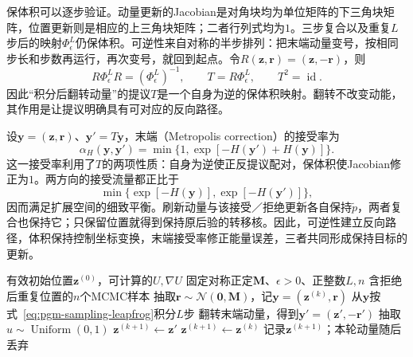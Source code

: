 保体积可以逐步验证。动量更新的Jacobian是对角块均为单位矩阵的下三角块矩阵，位置更新则是相应的上三角块矩阵；二者行列式均为$1$。三步复合以及重复$L$步后的映射$\Phi_{\epsilon}^{L}$仍保体积。可逆性来自对称的半步排列：把末端动量变号，按相同步长和步数再运行，再次变号，就回到起点。令$R(\bm{z},\bm{r})=(\bm{z},-\bm{r})$，则
\begin{equation}
  R\Phi_{\epsilon}^{L}R=(\Phi_{\epsilon}^{L})^{-1},
  \qquad
  T=R\Phi_{\epsilon}^{L},\qquad T^2=\operatorname{id}.
  \label{eq:pgm-sampling-hmc-reversibility}
\end{equation}
因此“积分后翻转动量”的提议$T$是一个自身为逆的保体积映射。翻转不改变动能，其作用是让提议明确具有可对应的反向路径。

设$\bm{y}=(\bm{z},\bm{r})$、$\bm{y}'=T\bm{y}$，末端（Metropolis correction）的接受率为
\begin{equation}
  \alpha_H(\bm{y},\bm{y}')
    =\min\{1,\exp[-H(\bm{y}')+H(\bm{y})]\}.
  \label{eq:pgm-sampling-hmc-acceptance}
\end{equation}
这一接受率利用了$T$的两项性质：自身为逆使正反提议配对，保体积使Jacobian修正为$1$。两方向的接受流量都正比于
\[
  \min\bigl\{\exp[-H(\bm{y})],\exp[-H(\bm{y}')]\bigr\},
\]
因而满足扩展空间的细致平衡。刷新动量与该接受／拒绝更新各自保持$\widetilde p$，两者复合也保持它；只保留位置就得到保持原后验的转移核。因此，可逆性建立反向路径，体积保持控制坐标变换，末端接受率修正能量误差，三者共同形成保持目标的更新。

\begin{algorithm}[固定步长与轨迹长度的HMC]
  \label{alg:pgm-sampling-hmc}
  \begin{algorithmic}[1]
    \Require 有效初始位置$\bm{z}^{(0)}$，可计算的$U,\nabla U$
    \Require 固定对称正定$\bm{M}$、$\epsilon>0$、正整数$L,n$
    \Ensure 含拒绝后重复位置的$n$个MCMC样本
      \State 抽取$\bm{r}\sim\mathcal{N}(\bm{0},\bm{M})$，记$\bm{y}=(\bm{z}^{(k)},\bm{r})$
      \State 从$\bm{y}$按式~\eqref{eq:pgm-sampling-leapfrog}积分$L$步
      \State 翻转末端动量，得到$\bm{y}'=(\bm{z}',-\bm{r}')$
      \State 抽取$u\sim\operatorname{Uniform}(0,1)$
        \State $\bm{z}^{(k+1)}\gets\bm{z}'$
      \Else
        \State $\bm{z}^{(k+1)}\gets\bm{z}^{(k)}$
      \EndIf
      \State 记录$\bm{z}^{(k+1)}$；本轮动量随后丢弃
    \EndFor
  \end{algorithmic}
\end{algorithm}

